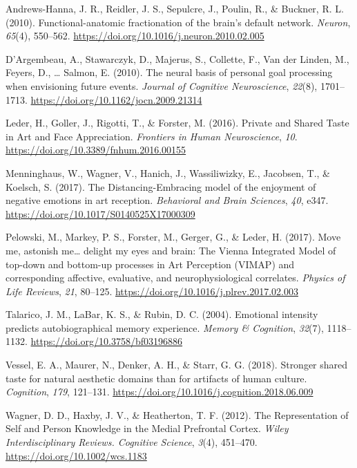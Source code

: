 \documentclass[
  man]{apa6}
\newlength{\cslhangindent}
\newlength{\cslentryspacingunit} %
\newenvironment{CSLReferences}[2] %
 {%
  \setlength{\parindent}{0pt}
  \ifodd #1
  \let\oldpar\par
  \def\par{\hangindent=\cslhangindent\oldpar}
  \fi
  \setlength{\parskip}{#2\cslentryspacingunit}
 }%
 {}
\begin{document}
\hypertarget{refs}{}
\begin{CSLReferences}{1}{0}
\leavevmode{}%
Andrews-Hanna, J. R., Reidler, J. S., Sepulcre, J., Poulin, R., \& Buckner, R. L. (2010). Functional-anatomic fractionation of the brain's default network. \emph{Neuron}, \emph{65}(4), 550--562. \url{https://doi.org/10.1016/j.neuron.2010.02.005}

\leavevmode{}%
D'Argembeau, A., Stawarczyk, D., Majerus, S., Collette, F., Van der Linden, M., Feyers, D., \ldots{} Salmon, E. (2010). The neural basis of personal goal processing when envisioning future events. \emph{Journal of Cognitive Neuroscience}, \emph{22}(8), 1701--1713. \url{https://doi.org/10.1162/jocn.2009.21314}

\leavevmode{}%
Leder, H., Goller, J., Rigotti, T., \& Forster, M. (2016). Private and {Shared} {Taste} in {Art} and {Face} {Appreciation}. \emph{Frontiers in Human Neuroscience}, \emph{10}. \url{https://doi.org/10.3389/fnhum.2016.00155}

\leavevmode{}%
Menninghaus, W., Wagner, V., Hanich, J., Wassiliwizky, E., Jacobsen, T., \& Koelsch, S. (2017). The {Distancing}-{Embracing} model of the enjoyment of negative emotions in art reception. \emph{Behavioral and Brain Sciences}, \emph{40}, e347. \url{https://doi.org/10.1017/S0140525X17000309}

\leavevmode{}%
Pelowski, M., Markey, P. S., Forster, M., Gerger, G., \& Leder, H. (2017). Move me, astonish me\ldots{} delight my eyes and brain: {The} {Vienna} {Integrated} {Model} of top-down and bottom-up processes in {Art} {Perception} ({VIMAP}) and corresponding affective, evaluative, and neurophysiological correlates. \emph{Physics of Life Reviews}, \emph{21}, 80--125. \url{https://doi.org/10.1016/j.plrev.2017.02.003}

\leavevmode{}%
Talarico, J. M., LaBar, K. S., \& Rubin, D. C. (2004). Emotional intensity predicts autobiographical memory experience. \emph{Memory \& Cognition}, \emph{32}(7), 1118--1132. \url{https://doi.org/10.3758/bf03196886}

\leavevmode{}%
Vessel, E. A., Maurer, N., Denker, A. H., \& Starr, G. G. (2018). Stronger shared taste for natural aesthetic domains than for artifacts of human culture. \emph{Cognition}, \emph{179}, 121--131. \url{https://doi.org/10.1016/j.cognition.2018.06.009}

\leavevmode{}%
Wagner, D. D., Haxby, J. V., \& Heatherton, T. F. (2012). The {Representation} of {Self} and {Person} {Knowledge} in the {Medial} {Prefrontal} {Cortex}. \emph{Wiley Interdisciplinary Reviews. Cognitive Science}, \emph{3}(4), 451--470. \url{https://doi.org/10.1002/wcs.1183}

\end{CSLReferences}
\end{document}
